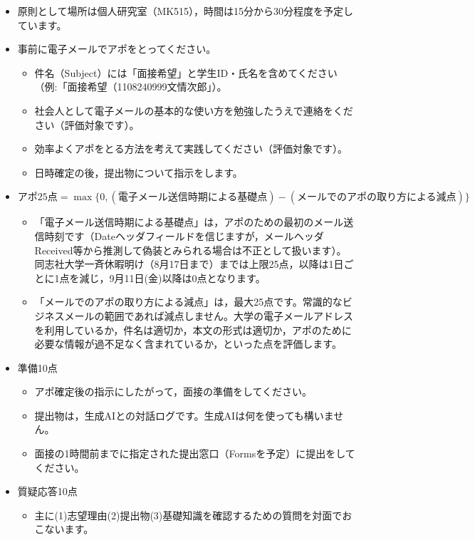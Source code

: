\documentclass[paper=a4paper,fontsize=10.4pt]{jlreq}
\begin{document}
\begin{itemize}
\item 原則として場所は個人研究室（MK515），時間は15分から30分程度を予定しています。
\item 事前に電子メールでアポをとってください。
  \begin{itemize}
  \item 件名（Subject）には「面接希望」と学生ID・氏名を含めてください（例:「面接希望（1108240999文情次郎」）。
  \item 社会人として電子メールの基本的な使い方を勉強したうえで連絡をください（評価対象です）。
  \item 効率よくアポをとる方法を考えて実践してください（評価対象です）。
  \item 日時確定の後，提出物について指示をします。
  \end{itemize}
\item $\text{アポ25点} = \max\{0,(\text{電子メール送信時期による基礎点}) - (\text{メールでのアポの取り方による減点})\}$
  \begin{itemize}
  \item 「電子メール送信時期による基礎点」は，アポのための最初のメール送信時刻です（Dateヘッダフィールドを信じますが，メールヘッダReceived等から推測して偽装とみられる場合は不正として扱います）。
  同志社大学一斉休暇明け（8月17日まで）までは上限25点，以降は1日ごとに1点を減じ，9月11日(金)以降は0点となります。
  \item 「メールでのアポの取り方による減点」は，最大25点です。常識的なビジネスメールの範囲であれば減点しません。大学の電子メールアドレスを利用しているか，件名は適切か，本文の形式は適切か，アポのために必要な情報が過不足なく含まれているか，といった点を評価します。
  \end{itemize}
\item 準備10点
  \begin{itemize}
  \item アポ確定後の指示にしたがって，面接の準備をしてください。
  \item 提出物は，生成AIとの対話ログです。生成AIは何を使っても構いません。
  \item 面接の1時間前までに指定された提出窓口（Formsを予定）に提出をしてください。
  \end{itemize}
\item 質疑応答10点
  \begin{itemize}
  \item 主に(1)志望理由(2)提出物(3)基礎知識を確認するための質問を対面でおこないます。
  \end{itemize}
\end{itemize}
\end{document}

